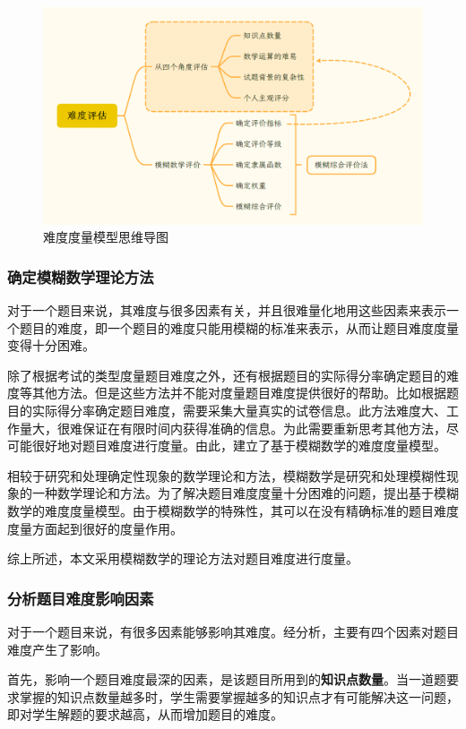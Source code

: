 \begin{figure}[h]
    \centering
    \includegraphics[scale=0.3]{res/figure040041.png}
    \caption{难度度量模型思维导图}
\end{figure}

\subsubsection{确定模糊数学理论方法}

对于一个题目来说，其难度与很多因素有关，并且很难量化地用这些因素来表示一个题目的难度，即一个题目的难度只能用模糊的标准来表示，从而让题目难度度量变得十分困难。

除了根据考试的类型度量题目难度之外，还有根据题目的实际得分率确定题目的难度等其他方法。但是这些方法并不能对度量题目难度提供很好的帮助。比如根据题目的实际得分率确定题目难度，需要采集大量真实的试卷信息。此方法难度大、工作量大，很难保证在有限时间内获得准确的信息。为此需要重新思考其他方法，尽可能很好地对题目难度进行度量。由此，建立了基于模糊数学的难度度量模型。

相较于研究和处理确定性现象的数学理论和方法，模糊数学是研究和处理模糊性现象的一种数学理论和方法\cite{MoHuShuXue}。为了解决题目难度度量十分困难的问题，提出基于模糊数学的难度度量模型。由于模糊数学的特殊性，其可以在没有精确标准的题目难度度量方面起到很好的度量作用。

综上所述，本文采用模糊数学的理论方法对题目难度进行度量。

\subsubsection{分析题目难度影响因素}

对于一个题目来说，有很多因素能够影响其难度。经分析，主要有四个因素对题目难度产生了影响。

首先，影响一个题目难度最深的因素，是该题目所用到的\textbf{知识点数量}。当一道题要求掌握的知识点数量越多时，学生需要掌握越多的知识点才有可能解决这一问题，即对学生解题的要求越高，从而增加题目的难度。

